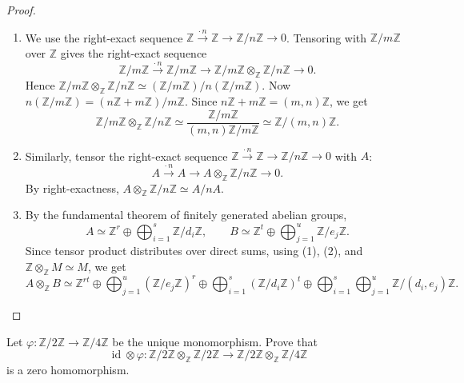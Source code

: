 \begin{proof}\leavevmode
    \begin{enumerate}
        \item We use the right-exact sequence $\mathbb{Z}\xrightarrow{\cdot\, n}\mathbb{Z}\to\mathbb{Z}/n\mathbb{Z}\to 0$. Tensoring with $\mathbb{Z}/m\mathbb{Z}$ over $\mathbb{Z}$ gives the right-exact sequence
              \[
                  \mathbb{Z}/m\mathbb{Z} \xrightarrow{\cdot\, n} \mathbb{Z}/m\mathbb{Z} \to \mathbb{Z}/m\mathbb{Z}\otimes_\mathbb{Z}\mathbb{Z}/n\mathbb{Z}\to 0.
              \]
              Hence $\mathbb{Z}/m\mathbb{Z}\otimes_\mathbb{Z}\mathbb{Z}/n\mathbb{Z}\simeq (\mathbb{Z}/m\mathbb{Z})/n(\mathbb{Z}/m\mathbb{Z})$. Now $n(\mathbb{Z}/m\mathbb{Z})=(n\mathbb{Z}+m\mathbb{Z})/m\mathbb{Z}$. Since $n\mathbb{Z}+m\mathbb{Z}=(m,n)\mathbb{Z}$, we get
              \[
                  \mathbb{Z}/m\mathbb{Z}\otimes_\mathbb{Z}\mathbb{Z}/n\mathbb{Z}\simeq \frac{\mathbb{Z}/m\mathbb{Z}}{(m,n)\mathbb{Z}/m\mathbb{Z}} \simeq \mathbb{Z}/(m,n)\mathbb{Z}.
              \]

        \item Similarly, tensor the right-exact sequence $\mathbb{Z}\xrightarrow{\cdot\, n}\mathbb{Z}\to\mathbb{Z}/n\mathbb{Z}\to 0$ with $A$:
              \[
                  A \xrightarrow{\cdot\, n} A \to A\otimes_\mathbb{Z}\mathbb{Z}/n\mathbb{Z}\to 0.
              \]
              By right-exactness, $A\otimes_\mathbb{Z}\mathbb{Z}/n\mathbb{Z}\simeq A/nA$.

        \item By the fundamental theorem of finitely generated abelian groups,
              \[
                  A\simeq \mathbb{Z}^r\oplus\bigoplus_{i=1}^s \mathbb{Z}/d_i\mathbb{Z}, \qquad B\simeq \mathbb{Z}^t\oplus\bigoplus_{j=1}^u \mathbb{Z}/e_j\mathbb{Z}.
              \]
              Since tensor product distributes over direct sums, using (1), (2), and $\mathbb{Z}\otimes_\mathbb{Z}M\simeq M$, we get
              \[
                  A\otimes_\mathbb{Z}B \simeq \mathbb{Z}^{rt}\oplus \bigoplus_{j=1}^u(\mathbb{Z}/e_j\mathbb{Z})^r \oplus\bigoplus_{i=1}^s(\mathbb{Z}/d_i\mathbb{Z})^t \oplus \bigoplus_{i=1}^s\bigoplus_{j=1}^u\mathbb{Z}/(d_i,e_j)\mathbb{Z}.
              \]
    \end{enumerate}
\end{proof}

\begin{exercise}
    Let $\varphi: \mathbb{Z}/2\mathbb{Z} \to \mathbb{Z}/4\mathbb{Z}$ be the unique monomorphism. Prove that
    \[
        \operatorname{id} \otimes \varphi: \mathbb{Z}/2\mathbb{Z} \otimes_{\mathbb{Z}} \mathbb{Z}/2\mathbb{Z} \to \mathbb{Z}/2\mathbb{Z} \otimes_{\mathbb{Z}} \mathbb{Z}/4\mathbb{Z}
    \]
    is a zero homomorphism.
\end{exercise}

